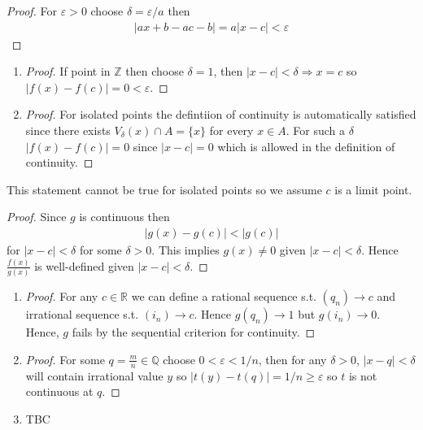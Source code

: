 \begin{proof}
    For $\varepsilon>0$ choose $\delta=\varepsilon/a$ then  
    \begin{align*}
        |ax+b - ac - b| = a|x-c| < \varepsilon
    \end{align*}
\end{proof}


\begin{enumerate}[label=(\alph*)]
    \item 
    \begin{proof}
        If point in $\mathbb{Z}$ then choose $\delta = 1$, then 
        $|x-c| < \delta \Rightarrow x=c$ so $|f(x)-f(c)|=0 < \varepsilon$.
    \end{proof}

    \item
    \begin{proof}
        For 
        isolated points the defintiion of continuity is automatically 
        satisfied since there exists $V_\delta(x)\cap A=\{x\}$ 
        for every $x\in A$.
        For such a $\delta$ $|f(x)-f(c)| = 0$ since $|x-c|=0$ which is allowed 
        in the definition of continuity.
    \end{proof}
\end{enumerate}

This statement cannot be true for isolated points so we 
assume $c$ is a limit point.
\begin{proof}
    Since $g$ is continuous then 
    \begin{align*}
        |g(x)-g(c)| < |g(c)|
    \end{align*}
    for $|x-c|<\delta$ for some $\delta>0$. This implies $g(x)\neq 0$ given 
    $|x-c|<\delta$. Hence $\frac{f(x)}{g(x)}$ is well-defined
    given $|x-c|<\delta$.
\end{proof}

\begin{enumerate}[label=(\alph*)]
    \item 
    \begin{proof}
        For any $c\in \mathbb{R}$ we can define a rational sequence s.t. 
        $(q_n)\rightarrow c$ and irrational sequence s.t. $(i_n)\rightarrow c$.
        Hence $g(q_n)\rightarrow 1$ but $g(i_n)\rightarrow 0$. Hence, 
        $g$ fails by the sequential criterion for continuity.
    \end{proof}

    \item 
    \begin{proof}
        For some $q=\frac{m}{n} \in \mathbb{Q}$ choose 
        $0<\varepsilon<1/n$, then for any $\delta>0$, 
        $|x-q|<\delta$ will contain irrational value $y$ 
        so $|t(y)-t(q)|=1/n\geq \varepsilon$ so $t$ is not 
        continuous at $q$.
    \end{proof}

    \item 
    TBC
\end{enumerate}

